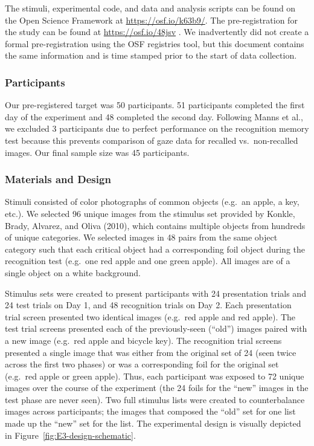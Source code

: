 \documentclass[
  man,floatsintext]{apa6}
\begin{document}
The stimuli, experimental code, and data and analysis scripts can be
found on the Open Science Framework at \url{https://osf.io/k63b9/}.
The pre-registration for the study can be
found at \url{https://osf.io/48jsv} . We
inadvertently did not create a formal pre-registration using the OSF
registries tool, but this document contains the same information and is
time stamped prior to the start of data collection.

\subsubsection{Participants}\label{participants-4}

Our pre-registered target was 50 participants. 51 participants completed
the first day of the experiment and 48 completed the second day.
Following Manns et al., we excluded 3 participants due to perfect
performance on the recognition memory test because this prevents
comparison of gaze data for recalled vs.~non-recalled images. Our final
sample size was 45 participants.

\subsubsection{Materials and Design}\label{materials-and-design-3}

Stimuli consisted of color photographs of common objects (e.g.~an apple, a key, etc.). We selected 96 unique images from the stimulus set provided by Konkle, Brady, Alvarez, and Oliva (2010), which contains multiple objects from hundreds of unique categories. We selected images in 48 pairs from the same object category such that each critical object had a corresponding foil object during the recognition test (e.g.~one red apple and one green apple). All images are of a single object on a white background.

Stimulus sets were created to present participants with 24 presentation trials and 24 test trials on Day 1, and 48 recognition trials on Day 2. Each presentation trial screen presented two identical images (e.g.~red apple and red apple). The test trial screens presented each of the previously-seen (``old'') images paired with a new image (e.g.~red apple and bicycle key). The recognition trial screens presented a single image that was either from the original set of 24 (seen twice across the first two phases) or was a corresponding foil for the original set (e.g.~red apple or green apple). Thus, each participant was exposed to 72 unique images over the course of the experiment (the 24 foils for the ``new'' images in the test phase are never seen). Two full stimulus lists were created to counterbalance images across participants; the images that composed the ``old'' set for one list made up the ``new'' set for the list. The experimental design is visually depicted in Figure~\ref{fig:E3-design-schematic}.
\end{document}
